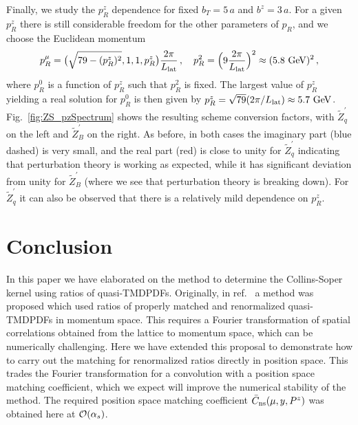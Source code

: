 \documentclass[11pt,a4paper]{article}
\DeclareRobustCommand{\fig}[1]{Fig.~\ref{fig:#1}}
\DeclareRobustCommand{\mycite}[1]{ref.~\cite{#1}}
\newcommand{\GeV}{\mathrm{GeV}}
\begin{document}
Finally, we study the $p_R^z$ dependence for fixed $b_T = 5\,a$ and $b^z = 3\,a$.
For a given $p_R^z$ there is still  considerable freedom for the other parameters of $p_R$, and we choose the Euclidean momentum
\begin{align}
 p_R^\mu = \bigl(\sqrt{79 - (p_R^z)^2}, 1, 1, p_R^z\bigr) \frac{2 \pi}{L_{\rm lat}}
 \,,\quad
 p_R^2 = \Bigl(9 \frac{2\pi}{L_{\rm lat}} \Bigr)^2 \approx (5.8~\GeV)^2
\,,\end{align}
where $p_R^0$ is a function of $p_R^z$ such that $p_R^2$ is fixed.
The largest value of $p_R^z$ yielding a real solution for $p_R^0$ is
then given by $p_R^z = \sqrt{79} (2\pi/L_{\rm lat}) \approx 5.7~\GeV$.
\fig{ZS_pzSpectrum} shows the resulting scheme conversion factors, with $\tilde Z_q^\prime$ on the left and $\tilde Z_B^\prime$ on the right.
As before, in both cases the imaginary part (blue dashed) is very small, and the real part (red) is close to unity for $\tilde Z_q^\prime$ indicating that perturbation theory is working as expected, while it has significant deviation from unity for $\tilde Z_B^\prime$ (where we see that perturbation theory is breaking down). 
For $\tilde Z_q^\prime$ it can also be observed that there is a relatively mild dependence on $p_R^z$. 




\FloatBarrier

\section{Conclusion}
\label{sec:conclusion}

In this paper we have elaborated on the method to determine the Collins-Soper kernel using ratios of quasi-TMDPDFs.
Originally, in \mycite{Ebert:2018gzl} a method was proposed which used ratios of properly matched and renormalized quasi-TMDPDFs in momentum space. This
requires a Fourier transformation of spatial correlations obtained from the lattice to momentum space, which can be numerically challenging.
Here we have extended this proposal to demonstrate how to carry out the matching for renormalized ratios directly in position space. This trades the Fourier transformation for a convolution with a position space matching coefficient, which we expect will improve the numerical stability of the method.  The required position space matching coefficient $\bar C_{\rm ns}(\mu,y,P^z)$ was obtained here at ${\cal O}(\alpha_s)$.
\end{document}

